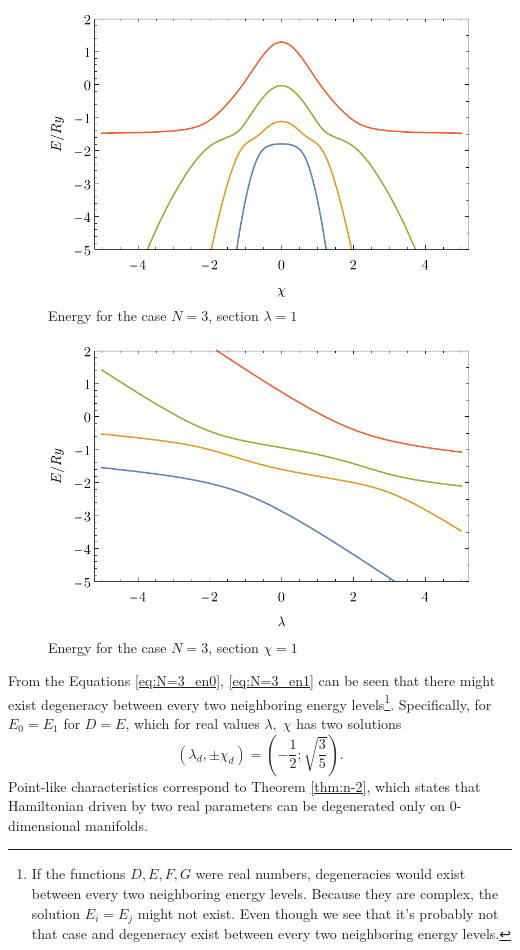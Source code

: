 \begin{figure}[H]
    \centering
    \includegraphics{../img/N=3_energiesl.pdf}
    \caption{Energy for the case $N=3$, section $\lambda=1$}
    \label{fig:N=3_energiesl}
\end{figure}
\begin{figure}[H]
    \centering
    \includegraphics{../img/N=3_energiesc.pdf}
    \caption{Energy for the case $N=3$, section $\chi=1$}
    \label{fig:N=3_energiesc}
\end{figure}

From the Equations \ref{eq:N=3_en0}, \ref{eq:N=3_en1} can be seen that there might exist degeneracy between every two neighboring energy levels\footnote{If the functions $D,E,F,G$ were real numbers, degeneracies would exist between every two neighboring energy levels. Because they are complex, the solution $E_i=E_j$ might not exist. Even though we see that it's probably not that case and degeneracy exist between every two neighboring energy levels.}. Specifically, for $E_0=E_1$ for $D=E$, which for real values $\lambda,\;\chi$ has two solutions
$$(\lambda_d,\pm \chi_d)=\left(-\frac{1}{2};\sqrt{\frac{3}{5}}\right).$$
Point-like characteristics correspond to Theorem \ref{thm:n-2}, which states that Hamiltonian driven by two real parameters can be degenerated only on 0-dimensional manifolds. 

